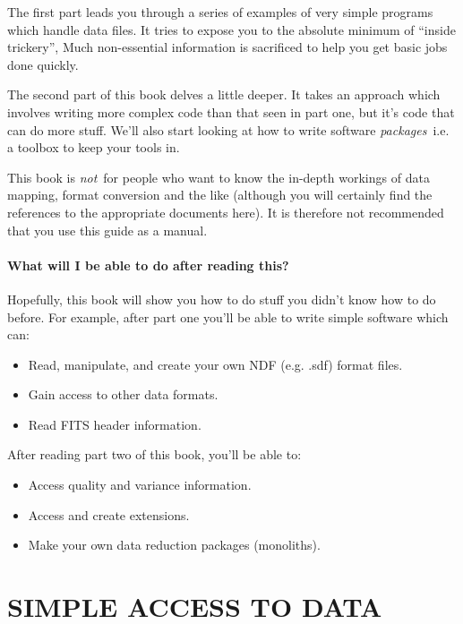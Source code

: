 \documentclass[11pt,nolof]{starlink}
\begin{document}
The first part leads you through a series of examples of very simple
programs which handle data files.
It tries to expose you to the absolute minimum
of ``inside trickery'',
Much non-essential information is sacrificed
to help you get basic jobs done quickly.

The second part of this book delves a little deeper.  It takes an approach
which involves writing more complex code than that seen in part one, but
it's code that can do more stuff. We'll also start looking at how to write
software \emph{packages}\, i.e. a toolbox to keep your tools in.

This book is \emph{not}\, for people who want to know the in-depth workings
of data mapping, format conversion and the like (although you will
certainly find the references to the appropriate documents here).  It is
therefore not recommended that you use this guide as a manual.

\subsection{What will I be able to do after reading this?}

Hopefully, this book will show you how to do stuff you didn't know how to do
before. For example, after part one you'll be able to write simple
software which can:

\begin{itemize}
\item Read, manipulate, and create your own NDF (e.g. .sdf) format files.
\item Gain access to other data formats.
\item Read FITS header information.
\end{itemize}

After reading part two of this book, you'll be able to:

\begin{itemize}
\item Access quality and variance information.
\item Access and create extensions.
\item Make your own data reduction packages (monoliths).
\end{itemize}

\newpage

\part{SIMPLE ACCESS TO DATA}
\end{document}
